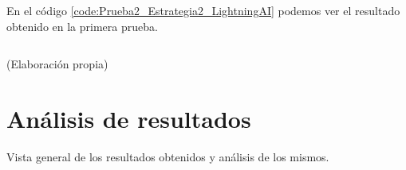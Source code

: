 En el código \ref{code:Prueba2_Estrategia2_LightningAI} podemos ver el resultado obtenido
en la primera prueba.

\begin{mycode}
    \begin{verbatim}

    \end{verbatim}
    \caption[]{ (Elaboración propia)}
    \label{code:Prueba2_Estrategia2_LightningAI}
\end{mycode}

\section{Análisis de resultados}
\label{sec:analisis_resultados}

Vista general de los resultados obtenidos y análisis de los mismos.